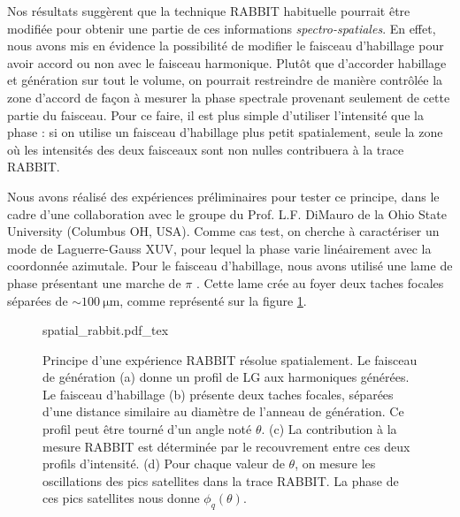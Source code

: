 Nos résultats suggèrent que la technique RABBIT habituelle pourrait être modifiée pour obtenir une partie de ces informations \textit{spectro-spatiales}. En effet, nous avons mis en évidence la possibilité de modifier le faisceau d'habillage pour avoir accord ou non avec le faisceau harmonique. Plutôt que d'accorder habillage et génération sur tout le volume, on pourrait restreindre de manière contrôlée la zone d'accord de façon à mesurer la phase spectrale provenant seulement de cette partie du faisceau. Pour ce faire, il est plus simple d'utiliser l'intensité que la phase : si on utilise un faisceau d'habillage plus petit spatialement, seule la zone où les intensités des deux faisceaux sont non nulles contribuera à la trace RABBIT. 

Nous avons réalisé des expériences préliminaires pour tester ce principe, dans le cadre d'une collaboration avec le groupe du Prof. L.F. DiMauro de la Ohio State University (Columbus OH, USA). Comme cas test, on cherche à caractériser un mode de Laguerre-Gauss XUV, pour lequel la phase varie linéairement avec la coordonnée azimutale. Pour le faisceau d'habillage, nous avons utilisé une lame de phase présentant une marche de $\pi$ . Cette lame crée au foyer deux taches focales séparées de $\sim \SI{100}{\micro\metre}$, comme représenté sur la figure \ref{fig:spatialrabbit}. 

\begin{figure}[!ht]
\centering
\def\svgwidth{\columnwidth}
{spatial_rabbit.pdf_tex}
\caption{Principe d'une expérience RABBIT résolue spatialement. Le faisceau de génération (a) donne un profil de LG aux harmoniques générées. Le faisceau d'habillage (b) présente deux taches focales, séparées d'une distance similaire au diamètre de l'anneau de génération. Ce profil peut être tourné d'un angle noté $\theta$. (c) La contribution à la mesure RABBIT est déterminée par le recouvrement entre ces deux profils d'intensité. (d) Pour chaque valeur de $\theta$, on mesure les oscillations des pics satellites dans la trace RABBIT. La phase de ces pics satellites nous donne $\phi_q(\theta)$.}
\label{fig:spatialrabbit}
\end{figure}

